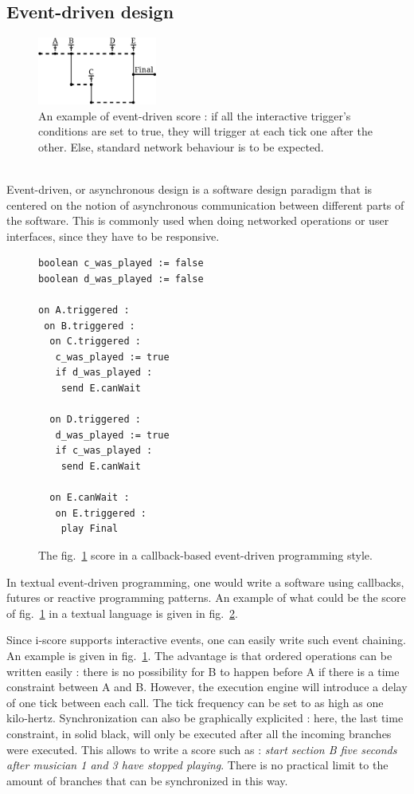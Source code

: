 \documentclass{article}
\begin{document}
\subsection{Event-driven design}
\begin{figure}[h]
    \centering
    \includegraphics[width=0.35\textwidth]{images/event.eps}
    \caption{An example of event-driven score : if all the interactive trigger's conditions are set to true, they will trigger at each tick one after the other. Else, standard network behaviour is to be expected.}
    \label{fig.event}
\end{figure}~\\
Event-driven, or asynchronous design is a software design 
paradigm that is centered on the notion of asynchronous 
communication between different parts of the software.
This is commonly used when doing networked operations or 
user interfaces, since they have to be responsive.

\begin{figure}[h]
\begin{lstlisting}[language=Algol,basicstyle={\footnotesize\tt}]
boolean c_was_played := false
boolean d_was_played := false
  
on A.triggered :
 on B.triggered :
  on C.triggered :
   c_was_played := true
   if d_was_played :
    send E.canWait

  on D.triggered :
   d_was_played := true
   if c_was_played :
    send E.canWait
  
  on E.canWait :
   on E.triggered :
    play Final
\end{lstlisting}
\caption{The fig.~\ref{fig.event} score in a callback-based event-driven programming style.}
\label{fig.eventdriven}
\end{figure}

In textual event-driven programming, one would write a software 
using callbacks, futures or reactive programming patterns\cite{kambona2013evaluation}. 
An example of what could be the score of fig.~\ref{fig.event} in a textual language is given in fig.~\ref{fig.eventdriven}.

Since i-score supports interactive events, one can easily write such event chaining.
An example is given in fig.~\ref{fig.event}. 
The advantage is that ordered operations can be written easily : there is no 
possibility for B to happen before A if there is a time constraint between A and B.
However, the execution engine will introduce a delay of one tick between each call.
The tick frequency can be set to as high as one kilo-hertz.
Synchronization can also be graphically explicited : here, the last time constraint, in solid black, will 
only be executed after all the incoming branches were executed. 
This allows to write a score such as : \emph{start section B five seconds after musician 1 and 3 
have stopped playing}.
There is no practical limit to the amount of branches that can be synchronized in this way.
\end{document}
